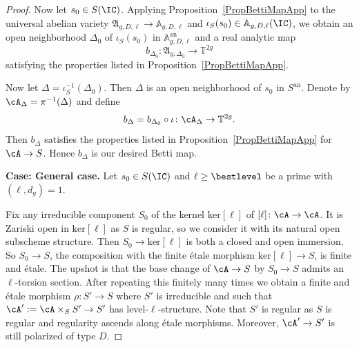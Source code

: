 \begin{proof}
Now let $s_0 \in S(\IC)$. Applying Proposition~\ref{PropBettiMapApp}
to the universal abelian variety
$\mathfrak{A}_{g,D,\ell} \rightarrow \mathbb A_{g,D,\ell}$ and
$\iota_S(s_0) \in \mathbb A_{g,D,\ell}(\IC)$, we obtain an
open neighborhood $\Delta_0$ of $\iota_S(s_0)$ in $\mathbb
A_{g,D,\ell}^{\mathrm{an}}$ and a real analytic map
\[
b_{\Delta_0} \colon \mathfrak{A}_{g,\Delta_0} \rightarrow \mathbb T^{2g}
\]
satisfying the properties listed in Proposition~\ref{PropBettiMapApp}.

Now let $\Delta = \iota_S^{-1}(\Delta_0)$. Then $\Delta$ is an open neighborhood of $s_0$ in $S^{\mathrm{an}}$. Denote by $\cA_{\Delta} = \pi^{-1}(\Delta)$ and define
\[
b_{\Delta} = b_{\Delta_0} \circ \iota \colon \cA_{\Delta} \rightarrow \mathbb T^{2g}.
\]
Then $b_{\Delta}$ satisfies the properties listed in Proposition~\ref{PropBettiMapApp} for $\cA \rightarrow S$. Hence $b_{\Delta}$ is our desired Betti map.



  \textbf{Case: General case.}
Let $s_0 \in S(\IC)$ and $\ell\ge\bestlevel$ be a prime with $(\ell,d_g)=1$.

Fix any irreducible component $S_0$ of the kernel $\mathrm{ker}[\ell]$ of $[\ell] \colon
\cA\rightarrow \cA$. It is Zariski open in $\mathrm{ker}[\ell]$ as $S$ is
regular, so we consider it with its natural open subscheme structure.
Then $S_0\rightarrow \mathrm{ker}[\ell]$ is both a closed and open
immersion. So $S_0\rightarrow S$, the composition with
the finite \'etale morphism $\mathrm{ker}[\ell]\rightarrow S$, is finite and \'etale.
The upshot is that the base change of $\cA\rightarrow S$ by $S_0\rightarrow S$
admits an $\ell$-torsion section. After repeating this finitely many
times we obtain a finite and \'etale morphism $\rho \colon S'
\rightarrow S$ where $S'$ is irreducible and such that $\cA':=
\cA\times_S S' \rightarrow S'$ has level-$\ell$-structure.
Note that $S'$ is regular as $S$ is regular and regularity ascends
along \'etale morphisms. Moreover,
 $\cA' \rightarrow S'$ is still polarized of type $D$.



\end{proof}

